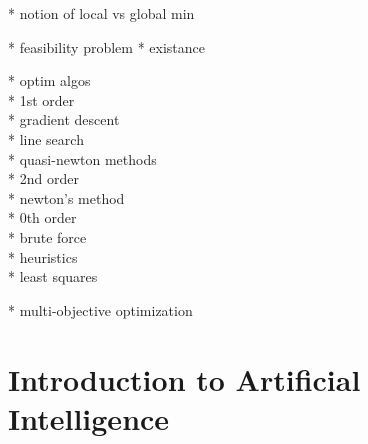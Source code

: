 * notion of local vs global min

* feasibility problem
* existance

* optim algos\\
 * 1st order\\
   * gradient descent\\
   * line search\\
   * quasi-newton methods\\
 * 2nd order\\
   * newton's method\\
 * 0th order\\
   * brute force\\
   * heuristics\\

* least squares

* multi-objective optimization

\section{Introduction to Artificial Intelligence}

\lipsum[13-18]